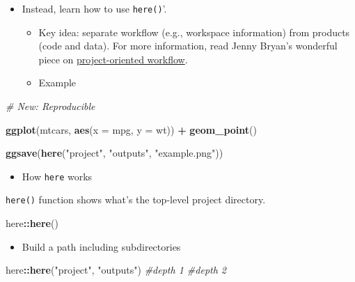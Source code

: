 \documentclass[
]{book}
\newenvironment{Shaded}{\begin{snugshade}}{\end{snugshade}}
\newcommand{\CommentTok}[1]{\textcolor[rgb]{0.56,0.35,0.01}{\textit{#1}}}
\newcommand{\DataTypeTok}[1]{\textcolor[rgb]{0.13,0.29,0.53}{#1}}
\newcommand{\KeywordTok}[1]{\textcolor[rgb]{0.13,0.29,0.53}{\textbf{#1}}}
\newcommand{\NormalTok}[1]{#1}
\newcommand{\OperatorTok}[1]{\textcolor[rgb]{0.81,0.36,0.00}{\textbf{#1}}}
\newcommand{\StringTok}[1]{\textcolor[rgb]{0.31,0.60,0.02}{#1}}
\providecommand{\tightlist}{%
  \setlength{\itemsep}{0pt}\setlength{\parskip}{0pt}}
\begin{document}
\begin{itemize}
\item
  Instead, learn how to use \texttt{here()}'.

  \begin{itemize}
  \item
    Key idea: separate workflow (e.g., workspace information) from products (code and data). For more information, read Jenny Bryan's wonderful piece on \href{https://www.tidyverse.org/blog/2017/12/workflow-vs-script/}{project-oriented workflow}.
  \item
    Example
  \end{itemize}
\end{itemize}

\begin{Shaded}
\begin{Highlighting}[]
\CommentTok{\# New: Reproducible }

\KeywordTok{ggplot}\NormalTok{(mtcars, }\KeywordTok{aes}\NormalTok{(}\DataTypeTok{x =}\NormalTok{ mpg, }\DataTypeTok{y =}\NormalTok{ wt)) }\OperatorTok{+}
\StringTok{   }\KeywordTok{geom\_point}\NormalTok{()}

\KeywordTok{ggsave}\NormalTok{(}\KeywordTok{here}\NormalTok{(}\StringTok{"project"}\NormalTok{, }\StringTok{"outputs"}\NormalTok{, }\StringTok{"example.png"}\NormalTok{))}
\end{Highlighting}
\end{Shaded}

\begin{itemize}
\tightlist
\item
  How \texttt{here} works
\end{itemize}

\texttt{here()} function shows what's the top-level project directory.

\begin{Shaded}
\begin{Highlighting}[]
\NormalTok{here}\OperatorTok{::}\KeywordTok{here}\NormalTok{()}
\end{Highlighting}
\end{Shaded}

\begin{itemize}
\tightlist
\item
  Build a path including subdirectories
\end{itemize}

\begin{Shaded}
\begin{Highlighting}[]
\NormalTok{here}\OperatorTok{::}\KeywordTok{here}\NormalTok{(}\StringTok{"project"}\NormalTok{, }\StringTok{"outputs"}\NormalTok{)}
           \CommentTok{\#depth 1   \#depth 2}
\end{Highlighting}
\end{Shaded}
\end{document}

